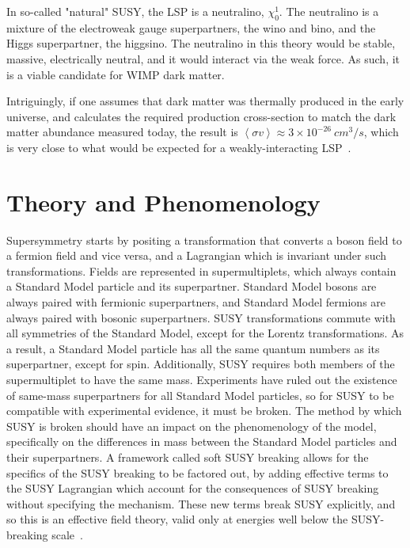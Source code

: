 In so-called "natural" SUSY, the LSP is a neutralino, $\chi_0^{1}$.
The neutralino is a mixture of the electroweak gauge superpartners, the wino and bino, and the Higgs superpartner, the higgsino.
The neutralino in this theory would be stable, massive, electrically neutral, and it would interact via the weak force.
As such, it is a viable candidate for WIMP dark matter.

Intriguingly, if one assumes that dark matter was thermally produced in the early universe,
and calculates the required production cross-section to match the dark matter abundance measured today,
the result is $\left<\sigma v\right> \approx 3 \times 10^{-26}~cm^{3}/s$,
which is very close to what would be expected for a weakly-interacting LSP~\cite{susy-dark-matter-1996}.

\section{Theory and Phenomenology}\label{sec:susy_theory}

Supersymmetry starts by positing a transformation that converts a boson field to a fermion field and vice versa,
and a Lagrangian which is invariant under such transformations.
Fields are represented in supermultiplets, which always contain a Standard Model particle and its superpartner.
Standard Model bosons are always paired with fermionic superpartners,
and Standard Model fermions are always paired with bosonic superpartners.
SUSY transformations commute with all symmetries of the Standard Model, except for the Lorentz transformations.
As a result, a Standard Model particle has all the same quantum numbers as its superpartner, except for spin.
Additionally, SUSY requires both members of the supermultiplet to have the same mass.
Experiments have ruled out the existence of same-mass superpartners for all Standard Model particles,
so for SUSY to be compatible with experimental evidence, it must be broken.
The method by which SUSY is broken should have an impact on the phenomenology of the model,
specifically on the differences in mass between the Standard Model particles and their superpartners.
A framework called soft SUSY breaking allows for the specifics of the SUSY breaking to be factored out,
by adding effective terms to the SUSY Lagrangian which account for the consequences of SUSY breaking without specifying the mechanism.
These new terms break SUSY explicitly, and so this is an effective field theory, valid only at energies well below the
SUSY-breaking scale~\cite{susy-soft-1981}.

